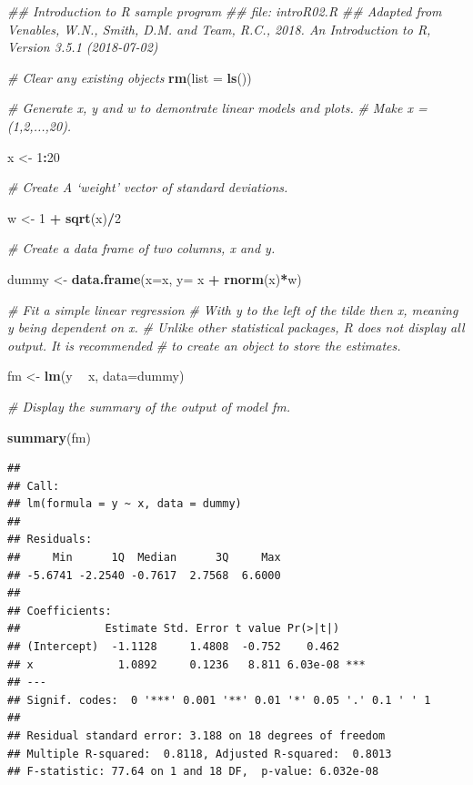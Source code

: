 \documentclass[]{book}
\newenvironment{Shaded}{\begin{snugshade}}{\end{snugshade}}
\newcommand{\CommentTok}[1]{\textcolor[rgb]{0.56,0.35,0.01}{\textit{#1}}}
\newcommand{\DataTypeTok}[1]{\textcolor[rgb]{0.13,0.29,0.53}{#1}}
\newcommand{\DecValTok}[1]{\textcolor[rgb]{0.00,0.00,0.81}{#1}}
\newcommand{\KeywordTok}[1]{\textcolor[rgb]{0.13,0.29,0.53}{\textbf{#1}}}
\newcommand{\NormalTok}[1]{#1}
\newcommand{\OperatorTok}[1]{\textcolor[rgb]{0.81,0.36,0.00}{\textbf{#1}}}
\newcommand{\StringTok}[1]{\textcolor[rgb]{0.31,0.60,0.02}{#1}}
\begin{document}
\begin{Shaded}
\begin{Highlighting}[]
\CommentTok{## Introduction to R sample program }
\CommentTok{## file: introR02.R}
\CommentTok{## Adapted from Venables, W.N., Smith, D.M. and Team, R.C., 2018. An Introduction to R, Version 3.5.1 (2018-07-02)}


\CommentTok{# Clear any existing objects }
\KeywordTok{rm}\NormalTok{(}\DataTypeTok{list =} \KeywordTok{ls}\NormalTok{())}

\CommentTok{# Generate x, y and w to demontrate linear models and plots.}
\CommentTok{# Make x = (1,2,...,20).}

\NormalTok{x <-}\StringTok{ }\DecValTok{1}\OperatorTok{:}\DecValTok{20}

\CommentTok{# Create A ‘weight’ vector of standard deviations.}

\NormalTok{w <-}\StringTok{ }\DecValTok{1} \OperatorTok{+}\StringTok{ }\KeywordTok{sqrt}\NormalTok{(x)}\OperatorTok{/}\DecValTok{2}

\CommentTok{# Create a data frame of two columns, x and y.}

\NormalTok{dummy <-}\StringTok{ }\KeywordTok{data.frame}\NormalTok{(}\DataTypeTok{x=}\NormalTok{x, }\DataTypeTok{y=}\NormalTok{ x }\OperatorTok{+}\StringTok{ }\KeywordTok{rnorm}\NormalTok{(x)}\OperatorTok{*}\NormalTok{w)}

\CommentTok{# Fit a simple linear regression }
\CommentTok{# With y to the left of the tilde then x, meaning y being dependent on x.}
\CommentTok{# Unlike other statistical packages, R does not display all output.  It is recommended}
\CommentTok{# to create an object to store the estimates.}

\NormalTok{fm <-}\StringTok{ }\KeywordTok{lm}\NormalTok{(y }\OperatorTok{~}\StringTok{ }\NormalTok{x, }\DataTypeTok{data=}\NormalTok{dummy) }

\CommentTok{# Display the summary of the output of model fm.}

\KeywordTok{summary}\NormalTok{(fm)}
\end{Highlighting}
\end{Shaded}

\begin{verbatim}
## 
## Call:
## lm(formula = y ~ x, data = dummy)
## 
## Residuals:
##     Min      1Q  Median      3Q     Max 
## -5.6741 -2.2540 -0.7617  2.7568  6.6000 
## 
## Coefficients:
##             Estimate Std. Error t value Pr(>|t|)    
## (Intercept)  -1.1128     1.4808  -0.752    0.462    
## x             1.0892     0.1236   8.811 6.03e-08 ***
## ---
## Signif. codes:  0 '***' 0.001 '**' 0.01 '*' 0.05 '.' 0.1 ' ' 1
## 
## Residual standard error: 3.188 on 18 degrees of freedom
## Multiple R-squared:  0.8118, Adjusted R-squared:  0.8013 
## F-statistic: 77.64 on 1 and 18 DF,  p-value: 6.032e-08
\end{verbatim}
\end{document}
